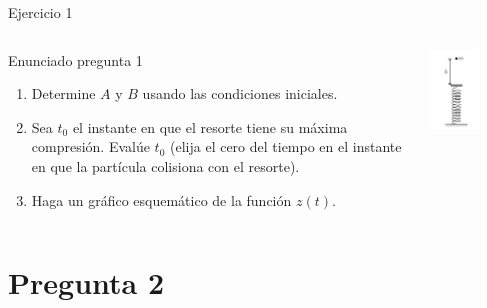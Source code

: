 \documentclass[
    10pt,
    aspectratio=169,
    xcolor={dvipsnames},
    spanish,
    ]{beamer}
\begin{document}
\begin{frame}{Ejercicio 1}
\begin{columns}[T,totalwidth=\textwidth]
\begin{column}{0.6\textwidth}
\begin{block}{Enunciado pregunta 1}
\begin{enumerate}
  \item Determine $A$ y $B$ usando las condiciones iniciales.
  \item Sea $t_0$ el instante en que el resorte tiene su máxima compresión. Evalúe $t_0$
  (elija el cero del tiempo en el instante en que la partícula colisiona con el resorte).
  \item Haga un gráfico esquemático de la función $z(t)$.
\end{enumerate}
      \end{block}
    \end{column}
    \begin{column}{0.40\textwidth}
      \centering
       \vspace*{1cm}
      \includegraphics[width=0.6\textwidth]{Auxiliar_2_9.png}
    \end{column}
  \end{columns}
\end{frame}
\section{Pregunta 2}
\end{document}
